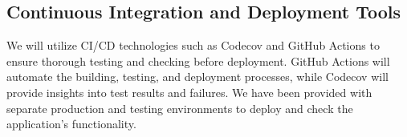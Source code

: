\documentclass[12pt]{article}
\begin{document}
\subsection{Continuous Integration and Deployment Tools}
We will utilize CI/CD technologies such as Codecov and GitHub Actions to ensure thorough testing and checking before deployment. GitHub Actions will automate the building, testing, and deployment processes, while Codecov will provide insights into test results and failures. We have been provided with separate production and testing environments to deploy and check the application's functionality.

\newpage
\end{document}
